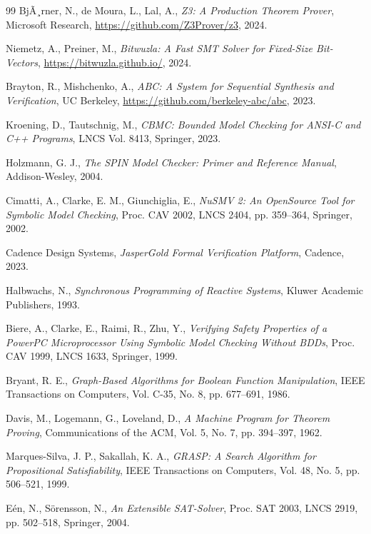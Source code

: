﻿\documentclass[12pt,a4paper]{report}
\begin{document}
\begin{thebibliography}{99}
  BjÃ¸rner, N., de Moura, L., Lal, A.,
  \textit{Z3: A Production Theorem Prover},
  Microsoft Research, \url{https://github.com/Z3Prover/z3}, 2024.

  Niemetz, A., Preiner, M.,
  \textit{Bitwuzla: A Fast SMT Solver for Fixed-Size Bit-Vectors},
  \url{https://bitwuzla.github.io/},
  2024.

  Brayton, R., Mishchenko, A.,
  \textit{ABC: A System for Sequential Synthesis and Verification},
  UC Berkeley, \url{https://github.com/berkeley-abc/abc}, 2023.

  Kroening, D., Tautschnig, M.,
  \textit{CBMC: Bounded Model Checking for ANSI-C and C++ Programs},
  LNCS Vol. 8413, Springer, 2023.

  Holzmann, G. J.,
  \textit{The SPIN Model Checker: Primer and Reference Manual},
  Addison-Wesley, 2004.

  Cimatti, A., Clarke, E. M., Giunchiglia, E.,
  \textit{NuSMV 2: An OpenSource Tool for Symbolic Model Checking},
  Proc. CAV 2002, LNCS 2404, pp. 359--364, Springer, 2002.

  Cadence Design Systems,
  \textit{JasperGold Formal Verification Platform},
  Cadence, 2023.

  Halbwachs, N.,
  \textit{Synchronous Programming of Reactive Systems},
  Kluwer Academic Publishers, 1993.

  Biere, A., Clarke, E., Raimi, R., Zhu, Y.,
  \textit{Verifying Safety Properties of a PowerPC Microprocessor Using Symbolic Model
  Checking Without BDDs},
  Proc. CAV 1999, LNCS 1633, Springer, 1999.

  Bryant, R. E.,
  \textit{Graph-Based Algorithms for Boolean Function Manipulation},
  IEEE Transactions on Computers, Vol. C-35, No. 8, pp. 677--691, 1986.

  Davis, M., Logemann, G., Loveland, D.,
  \textit{A Machine Program for Theorem Proving},
  Communications of the ACM, Vol. 5, No. 7, pp. 394--397, 1962.

  Marques-Silva, J. P., Sakallah, K. A.,
  \textit{GRASP: A Search Algorithm for Propositional Satisfiability},
  IEEE Transactions on Computers, Vol. 48, No. 5, pp. 506--521, 1999.

  Eén, N., Sörensson, N.,
  \textit{An Extensible SAT-Solver},
  Proc. SAT 2003, LNCS 2919, pp. 502--518, Springer, 2004.


\end{thebibliography}
\end{document}
